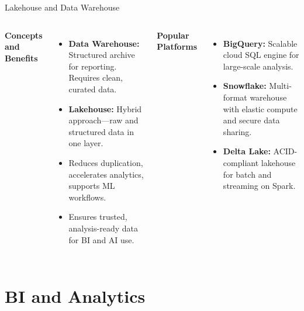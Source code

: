 \documentclass[aspectratio=169, table]{beamer}
\begin{document}
	\begin{frame}[fragile]{Lakehouse and Data Warehouse}
		\vspace{20pt}
		\begin{columns}[T,onlytextwidth]
			\textbf{Concepts and Benefits}
			\begin{itemize}
				\item \textbf{Data Warehouse:} Structured archive for reporting. Requires clean, curated data.
				\item \textbf{Lakehouse:} Hybrid approach—raw and structured data in one layer.
				\item Reduces duplication, accelerates analytics, supports ML workflows.
				\item Ensures trusted, analysis-ready data for BI and AI use.
			\end{itemize}
			
			\textbf{Popular Platforms}
			\begin{itemize}
				\item \textbf{BigQuery:} Scalable cloud SQL engine for large-scale analysis.
				\item \textbf{Snowflake:} Multi-format warehouse with elastic compute and secure data sharing.
				\item \textbf{Delta Lake:} ACID-compliant lakehouse for batch and streaming on Spark.
			\end{itemize}
		\end{columns}
	\end{frame}
	
	
	\section{BI and Analytics}
	
\end{document}
